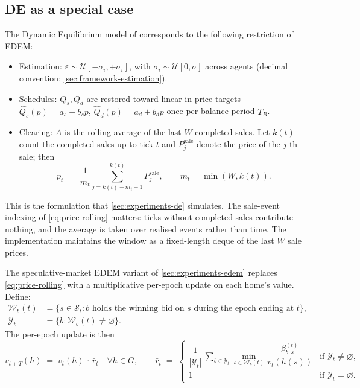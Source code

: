 \subsection{DE as a special case}
\label{sec:framework-de-special}

The Dynamic Equilibrium model of \citet{arbuzov2018de} corresponds to
the following restriction of EDEM:
\begin{itemize}[leftmargin=*,nosep]
\item Estimation: $\varepsilon \sim \mathcal{U}[-\sigma_{i}, +\sigma_{i}]$,
      with $\sigma_{i} \sim \mathcal{U}[0, \bar{\sigma}]$ across agents
      (decimal convention; \cref{sec:framework-estimation}).
\item Schedules: $Q_{s}, Q_{d}$ are restored toward linear-in-price
      targets $\hat{Q}_{s}(p) = a_{s} + b_{s} p$,
      $\hat{Q}_{d}(p) = a_{d} + b_{d} p$ once per balance period $T_{B}$.
\item Clearing: $A$ is the rolling average of the last $W$ completed
      sales. Let $k(t)$ count the completed sales up to tick $t$ and
      $P^{\mathrm{sale}}_{j}$ denote the price of the $j$-th sale; then
      \begin{equation}
      \label{eq:price-rolling}
      p_{t} \;=\; \frac{1}{m_{t}} \sum_{j=k(t)-m_{t}+1}^{k(t)} P^{\mathrm{sale}}_{j},
      \qquad m_{t} = \min(W, k(t)).
      \end{equation}
\end{itemize}
This is the formulation that \cref{sec:experiments-de} simulates. The
sale-event indexing of \cref{eq:price-rolling} matters: ticks without
completed sales contribute nothing, and the average is taken over
realised events rather than time. The implementation maintains the
window as a fixed-length deque of the last $W$ sale prices.

The speculative-market EDEM variant of \cref{sec:experiments-edem}
replaces \cref{eq:price-rolling} with a multiplicative per-epoch
update on each home's value. Define:
\begin{align*}
\mathcal{W}_{b}(t) &= \{s \in \mathcal{S}_{t} : b \text{ holds the winning bid on } s \text{ during the epoch ending at } t\}, \\
\mathcal{Y}_{t}    &= \{b : \mathcal{W}_{b}(t) \neq \varnothing\}.
\end{align*}
The per-epoch update is then
\begin{equation}
\label{eq:value-update}
v_{t+T}(h) \;=\; v_{t}(h)\,\cdot\,\bar{r}_{t} \quad \forall h \in G,
\qquad
\bar{r}_{t} \;=\;
\begin{cases}
\dfrac{1}{|\mathcal{Y}_{t}|}\,\displaystyle\sum_{b \in \mathcal{Y}_{t}} \min_{s \in \mathcal{W}_{b}(t)} \dfrac{\beta_{b,s}^{(t)}}{v_{t}(h(s))}
& \text{if } \mathcal{Y}_{t} \neq \varnothing, \\[1.6ex]
1 & \text{if } \mathcal{Y}_{t} = \varnothing.
\end{cases}
\end{equation}

